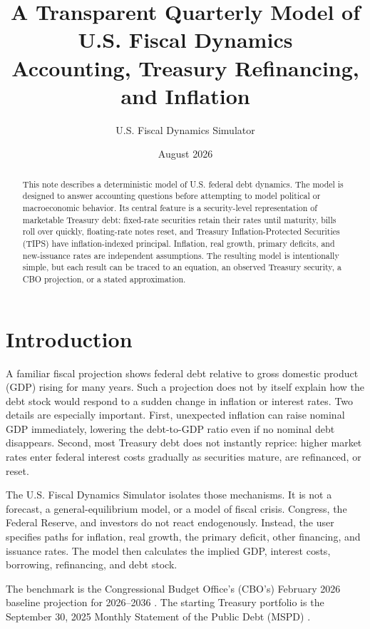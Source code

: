 \documentclass[10pt]{article}
\title{A Transparent Quarterly Model of U.S. Fiscal Dynamics\\
\large Accounting, Treasury Refinancing, and Inflation}
\author{U.S. Fiscal Dynamics Simulator}
\date{August 2026}
\begin{document}
\maketitle

\begin{abstract}
This note describes a deterministic model of U.S. federal debt dynamics.  The model is
designed to answer accounting questions before attempting to model political or
macroeconomic behavior.  Its central feature is a security-level representation of
marketable Treasury debt: fixed-rate securities retain their rates until maturity, bills
roll over quickly, floating-rate notes reset, and Treasury Inflation-Protected Securities
(TIPS) have inflation-indexed principal.  Inflation, real growth, primary deficits, and
new-issuance rates are independent assumptions.  The resulting model is intentionally
simple, but each result can be traced to an equation, an observed Treasury security, a CBO
projection, or a stated approximation.
\end{abstract}

\section{Introduction}

A familiar fiscal projection shows federal debt relative to gross domestic product (GDP)
rising for many years.  Such a projection does not by itself explain how the debt stock
would respond to a sudden change in inflation or interest rates.  Two details are
especially important.  First, unexpected inflation can raise nominal GDP immediately,
lowering the debt-to-GDP ratio even if no nominal debt disappears.  Second, most Treasury
debt does not instantly reprice: higher market rates enter federal interest costs gradually
as securities mature, are refinanced, or reset.

The U.S. Fiscal Dynamics Simulator isolates those mechanisms.  It is not a
forecast, a general-equilibrium model, or a model of fiscal crisis.  Congress, the Federal
Reserve, and investors do not react endogenously.  Instead, the user specifies paths for
inflation, real growth, the primary deficit, other financing, and issuance rates.  The
model then calculates the implied GDP, interest costs, borrowing, refinancing, and debt
stock.

The benchmark is the Congressional Budget Office's (CBO's) February 2026 baseline
projection for 2026--2036 \cite{cbo2026outlook}.  The starting Treasury portfolio is the
September 30, 2025 Monthly Statement of the Public Debt (MSPD) \cite{mspd}.
\end{document}
